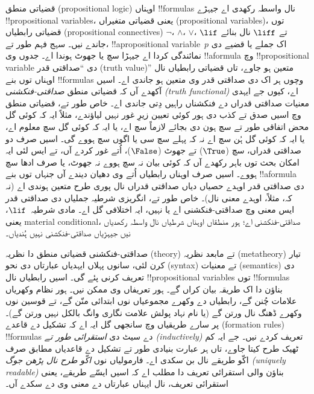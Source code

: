 \documentclass[../../../include/open-logic-section]{subfiles}
\begin{document}


قضیاتی منطق (propositional logic) اوہناں !!{formula}s نال واسطہ رکھدی
اے جیہڑے !!{propositional variable}s، یعنی قضیاتی متغیراں
(propositional variables)، توں قضیاتی رابطیاں (propositional
connectives)
$\lnot$، $\land$، $\lor$، $\lif$ تے $\liff$ نال بنائے جاندے نیں۔ سہج
فہم طور تے، !!a{propositional variable}~$p$ اک جملے یا قضیے دی
نمائندگی کردا اے جیہڑا سچ یا جھوٹ ہوندا اے۔ جدوں وی !!a{formula} وچ
!!{propositional variable} دی ``صداقتی قدر (truth value)'' متعین ہو
جاوے، تاں
قضیاتی رابطیاں نال اوہناں توں بنے !!{formula}s وچوں ہر اک دی صداقتی قدر وی متعین
ہو جاندی اے۔ اسیں آکھدے آں کہ قضیاتی منطق
\emph{صداقتی-فنکشنی (truth functional)} اے، کیوں جے ایہدی معنیات
صداقتی قدراں دے فنکشناں
راہیں دِتی جاندی اے۔ خاص طور تے، قضیاتی منطق وچ اسیں صدق تے کذب دی
ہور کوئی تعیین زیرِ غور نہیں لیاؤندے، مثلاً ایہ کہ کوئی گل محض اتفاقی
طور تے سچ ہون دی بجائے لازماً سچ اے، یا ایہ کہ کوئی گل سچ معلوم اے، یا
ایہ کہ کوئی گل ہُن سچ اے نہ کہ پہلے سچ سی یا اگوں سچ ہووے گی۔ اسیں صرف
دو صداقتی قدراں، سچ ($\True$) تے جھوٹ ($\False$)، اُتے غور کردے آں، تے
ایس لئی ایہ امکان بحث توں باہر رکھدے آں کہ کوئی بیان نہ سچ ہووے نہ
جھوٹ، یا صرف ادھا سچ ہووے۔ اسیں صرف اوہناں رابطیاں اُتے وی دھیان
دیندے آں جنہاں توں بنے !!a{formula} دی صداقتی قدر اوہدے حصیاں دیاں
صداقتی قدراں نال پوری طرح متعین ہوندی اے (نہ کہ، مثلاً، اوہدے معنی
نال)۔ خاص طور تے، انگریزی شرطیہ جملیاں دی صداقتی قدر ایس معنی وچ
صداقتی-فنکشنی اے یا نہیں، ایہ اختلافی گل اے۔ مادی شرطیہ~$\lif$، یعنی
material conditional، صداقتی-فنکشنی اے؛ ہور منطقاں اوہناں شرطیاں نال
واسطہ رکھدیاں نیں
جیہڑیاں صداقتی-فنکشنی نہیں ہُندیاں۔

صداقتی-فنکشنی قضیاتی منطق دا نظریہ (theory) تے مابعد نظریہ
(metatheory) تیار کرن لئی، سانوں پہلاں ایہدیاں عبارتاں دی نحو (syntax)
تے معنیات (semantics) دی تعریف کرنی پئے گی۔ اسیں
رابطیاں نال !!{propositional variable}s توں !!{formula}s بناؤن دا اک
طریقہ بیان کراں گے۔ ہور تعریفاں وی ممکن نیں۔ ہور نظام وکھریاں علامات
چُنن گے، رابطیاں دے وکھرے مجموعیاں نوں ابتدائی منّن گے، تے قوسین نوں
وکھرے ڈھنگ نال ورتن گے (یا نام نہاد پولش علامت نگاری وانگ بالکل نہیں
ورتن گے)۔ پر سارے طریقیاں وچ سانجھی گل ایہ اے کہ تشکیل دے قاعدے
(formation rules)
!!{formula}s دے سیٹ دی
\emph{استقرائی طور تے (inductively)} تعریف کردے نیں۔ جے ایہ کم ٹھیک
طرح کیتا جاوے،
تاں ہر عبارت بنیادی طور تے تشکیل دے قاعدیاں مطابق صرف اکّو طریقے نال
بن سکدی اے۔ فارمولیاں نوں
\emph{اکّو طرح نال پڑھن جوگ (uniquely readable)} بناؤن والی استقرائی
تعریف دا مطلب اے کہ
اسیں ایسّے طریقے، یعنی استقرائی تعریف، نال ایہناں عبارتاں دے معنی وی
دے سکدے آں۔
\end{document}

